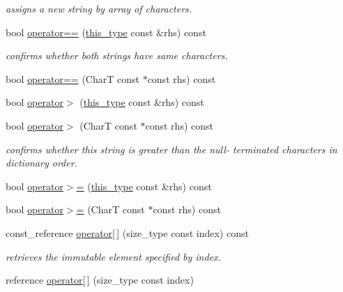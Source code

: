 \begin{DoxyCompactItemize}
\begin{DoxyCompactList}\small\item\em assigns a new string by array of characters. \end{DoxyCompactList}\item 
\hypertarget{classhryky_1_1_string_a4480f7768eb5a9afce82696513af50e9}{bool \hyperlink{classhryky_1_1_string_a4480f7768eb5a9afce82696513af50e9}{operator==} (\hyperlink{classhryky_1_1_string}{this\-\_\-type} const \&rhs) const }\label{classhryky_1_1_string_a4480f7768eb5a9afce82696513af50e9}

\begin{DoxyCompactList}\small\item\em confirms whether both strings have same characters. \end{DoxyCompactList}\item 
bool \hyperlink{classhryky_1_1_string_a48283b80979ce1e09ac69f915ac4209f}{operator==} (Char\-T const $\ast$const rhs) const 
\item 
bool \hyperlink{classhryky_1_1_string_af95769666d2ba09ca36310dc1e97de8e}{operator$>$} (\hyperlink{classhryky_1_1_string}{this\-\_\-type} const \&rhs) const 
\item 
bool \hyperlink{classhryky_1_1_string_a7f2c88da9ad92fa5fcc3cdaa4f26d4d7}{operator$>$} (Char\-T const $\ast$const rhs) const 
\begin{DoxyCompactList}\small\item\em confirms whether this string is greater than the null-\/ terminated characters in dictionary order. \end{DoxyCompactList}\item 
bool \hyperlink{classhryky_1_1_string_a60476053dfd6e120ff03cea4b4575af7}{operator$>$=} (\hyperlink{classhryky_1_1_string}{this\-\_\-type} const \&rhs) const 
\item 
bool \hyperlink{classhryky_1_1_string_af179712fb033e3cc1f0699d8ec4abed5}{operator$>$=} (Char\-T const $\ast$const rhs) const 
\item 
\hypertarget{classhryky_1_1_string_ae4170a6bb4266d9185c88560014ca7fe}{const\-\_\-reference \hyperlink{classhryky_1_1_string_ae4170a6bb4266d9185c88560014ca7fe}{operator\mbox{[}$\,$\mbox{]}} (size\-\_\-type const index) const }\label{classhryky_1_1_string_ae4170a6bb4266d9185c88560014ca7fe}

\begin{DoxyCompactList}\small\item\em retrieves the immutable element specified by index. \end{DoxyCompactList}\item 
\hypertarget{classhryky_1_1_string_a069059a9fefbffa776be63db1594561b}{reference \hyperlink{classhryky_1_1_string_a069059a9fefbffa776be63db1594561b}{operator\mbox{[}$\,$\mbox{]}} (size\-\_\-type const index)}\label{classhryky_1_1_string_a069059a9fefbffa776be63db1594561b}


\end{DoxyCompactItemize}

